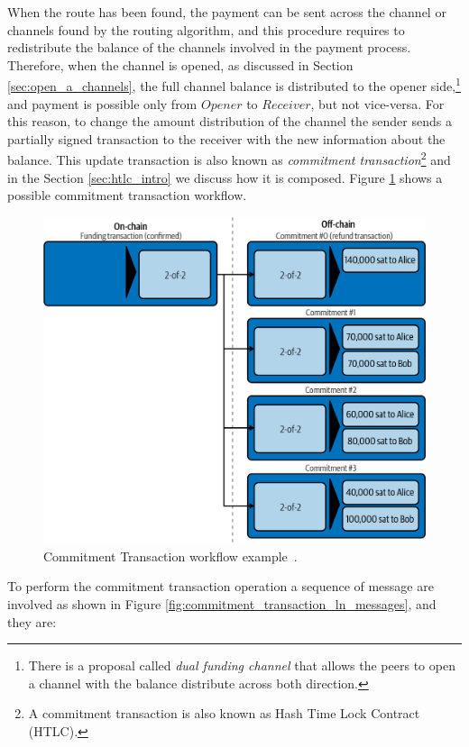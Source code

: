 When the route has been found, the payment can be sent across the channel or channels found by the routing algorithm, and this procedure
requires to redistribute the balance of the channels involved in the payment process.\\
Therefore, when the channel is opened, as discussed in Section \ref{sec:open_a_channels}, the full channel balance
is distributed to the opener side,\footnote{There is a proposal called \emph{dual funding channel} that allows the peers to open a channel with the balance distribute across both direction.}
and payment is possible only from $Opener$ to $Receiver$, but not vice-versa. For this reason, to change the amount distribution
of the channel the sender sends a partially signed transaction to the receiver with the new information about the balance.
This update transaction is also known as \emph{commitment transaction}\footnote{A commitment transaction is also known as Hash Time Lock Contract (HTLC).} and in the Section \ref{sec:htlc_intro} we discuss how it is composed.
Figure \ref{fig:commitment_transaction_example} shows a possible commitment transaction workflow.

\begin{figure}[h]
  \begin{center}
  \includegraphics[width=0.6\columnwidth]{imgs/mtln_0706.png}
  \end{center}
    \caption{Commitment Transaction workflow example~\cite{lnbook}.}
  \label{fig:commitment_transaction_example}
\end{figure}


To perform the commitment transaction operation a sequence of {\LN} message are involved as shown in Figure \ref{fig:commitment_transaction_ln_messages}, and they are:

